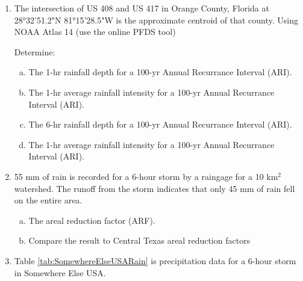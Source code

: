 \documentclass[12pt]{article}
\begin{document}
\begin{enumerate}
\clearpage

\item The intersection of US 408 and US 417 in Orange County, Florida at 28°32'51.2"N 81°15'28.5"W is the approximate centroid of that county. Using NOAA Atlas 14 (use the online PFDS tool)

Determine:
    \begin{enumerate}[a)]
        \item The 1-hr rainfall depth for a 100-yr Annual Recurrance Interval (ARI). 
        \item The 1-hr average rainfall intensity for a 100-yr Annual Recurrance Interval (ARI). 
        \item The 6-hr rainfall depth for a 100-yr Annual Recurrance Interval (ARI). 
        \item The 1-hr average rainfall intensity for a 100-yr Annual Recurrance Interval (ARI). 
    \end{enumerate}

\clearpage

\item 55 mm of rain is recorded for a 6-hour storm by a raingage for a 10 km$^2$ watershed.  The runoff from the storm indicates that only 45 mm of rain fell on the entire area.  

    \begin{enumerate}[a)]
        \item The areal reduction factor  (ARF). 
        \item Compare the result to Central Texas areal reduction factors 
    \end{enumerate}

\clearpage
\item Table \ref{tab:SomewhereElseUSARain} is precipitation data for a 6-hour storm in Somewhere Else USA.


\end{enumerate}
\end{document}
